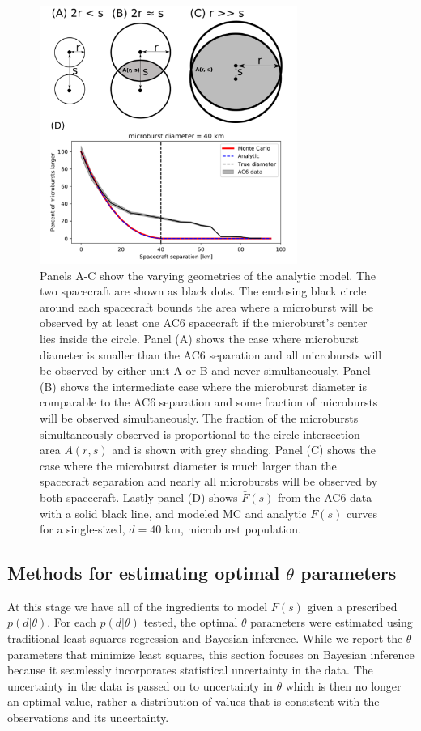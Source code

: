 \documentclass[draft]{agujournal2019}
\begin{document}
\begin{figure}
\includegraphics[width=0.75\textwidth]{fig5.png}
\caption{Panels A-C show the varying geometries of the analytic model. The two spacecraft are shown as black dots. The enclosing black circle around each spacecraft bounds the area where a microburst will be observed by at least one AC6 spacecraft if the microburst's center lies inside the circle. Panel (A) shows the case where microburst diameter is smaller than the AC6 separation and all microbursts will be observed by either unit A or B and never simultaneously. Panel (B) shows the intermediate case where the microburst diameter is comparable to the AC6 separation and some fraction of microbursts will be observed simultaneously. The fraction of the microbursts simultaneously observed is proportional to the circle intersection area $A(r, s)$ and is shown with grey shading. Panel (C) shows the case where the microburst diameter is much larger than the spacecraft separation and nearly all microbursts will be observed by both spacecraft. Lastly panel (D) shows $\bar{F}(s)$ from the AC6 data with a solid black line, and modeled MC and analytic $\bar{F}(s)$ curves for a single-sized, $d = 40$ km,  microburst population.} 
\label{fig5}
\end{figure}

\subsection{Methods for estimating optimal $\theta$ parameters}
At this stage we have all of the ingredients to model $\bar{F}(s)$ given a prescribed $p(d | \theta)$. For each $p(d | \theta)$ tested, the optimal $\theta$ parameters were estimated using traditional least squares regression and Bayesian inference. While we report the $\theta$ parameters that minimize least squares, this section focuses on Bayesian inference because it seamlessly incorporates statistical uncertainty in the data. The uncertainty in the data is passed on to uncertainty in $\theta$ which is then no longer an optimal value, rather a distribution of values that is consistent with the observations and its uncertainty. 
\end{document}
